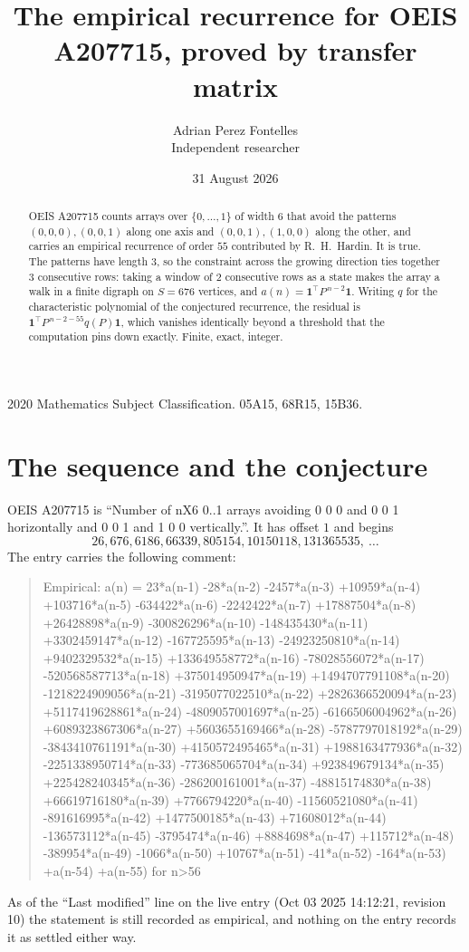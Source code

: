 \documentclass[11pt,a4paper]{article}
\title{The empirical recurrence for OEIS A207715, proved by transfer matrix}
\author{Adrian Perez Fontelles\\ \small Independent researcher}
\date{31 August 2026}
\theoremstyle{plain}
\theoremstyle{definition}
\begin{document}
\maketitle

\begin{abstract}
OEIS A207715 counts arrays over $\{0,\dots,1\}$ of width $6$ that avoid the patterns
$(0,0,0), (0,0,1)$ along one axis and $(0,0,1), (1,0,0)$ along the other, and carries an empirical recurrence of
order $55$ contributed by R.~H.~Hardin. It is true. The patterns have length $3$, so
the constraint across the growing direction ties together $3$ consecutive rows: taking a
window of $2$ consecutive rows as a state makes the array a walk in a finite digraph
on $S=676$ vertices, and $a(n)=\mathbf{1}^{\!\top}P^{\,n-2}\mathbf{1}$. Writing $q$
for the characteristic polynomial of the conjectured recurrence, the residual is
$\mathbf{1}^{\!\top}P^{\,n-2-55}q(P)\mathbf{1}$, which vanishes identically
beyond a threshold that the computation pins down exactly. Finite, exact, integer.
\end{abstract}

\noindent\small 2020 Mathematics Subject Classification. 05A15, 68R15, 15B36.\normalsize

\section{The sequence and the conjecture}

OEIS A207715 is ``Number of nX6 0..1 arrays avoiding 0 0 0 and 0 0 1 horizontally and 0 0 1 and 1 0 0 vertically.''. It has offset
$1$ and begins
\[
26, 676, 6186, 66339, 805154, 10150118, 131365535,\ \dots
\]
The entry carries the following comment:
\begin{quote}\small
Empirical: a(n) = 23*a(n-1) -28*a(n-2) -2457*a(n-3) +10959*a(n-4) +103716*a(n-5) -634422*a(n-6) -2242422*a(n-7) +17887504*a(n-8) +26428898*a(n-9) -300826296*a(n-10) -148435430*a(n-11) +3302459147*a(n-12) -167725595*a(n-13) -24923250810*a(n-14) +9402329532*a(n-15) +133649558772*a(n-16) -78028556072*a(n-17) -520568587713*a(n-18) +375014950947*a(n-19) +1494707791108*a(n-20) -1218224909056*a(n-21) -3195077022510*a(n-22) +2826366520094*a(n-23) +5117419628861*a(n-24) -4809057001697*a(n-25) -6166506004962*a(n-26) +6089323867306*a(n-27) +5603655169466*a(n-28) -5787797018192*a(n-29) -3843410761191*a(n-30) +4150572495465*a(n-31) +1988163477936*a(n-32) -2251338950714*a(n-33) -773685065704*a(n-34) +923849679134*a(n-35) +225428240345*a(n-36) -286200161001*a(n-37) -48815174830*a(n-38) +66619716180*a(n-39) +7766794220*a(n-40) -11560521080*a(n-41) -891616995*a(n-42) +1477500185*a(n-43) +71608012*a(n-44) -136573112*a(n-45) -3795474*a(n-46) +8884698*a(n-47) +115712*a(n-48) -389954*a(n-49) -1066*a(n-50) +10767*a(n-51) -41*a(n-52) -164*a(n-53) +a(n-54) +a(n-55) for n>56
\end{quote}
As of the ``Last modified'' line on the live entry (Oct 03 2025 14:12:21, revision
10) the statement is still recorded as empirical, and nothing on the entry
records it as settled either way.
\end{document}
